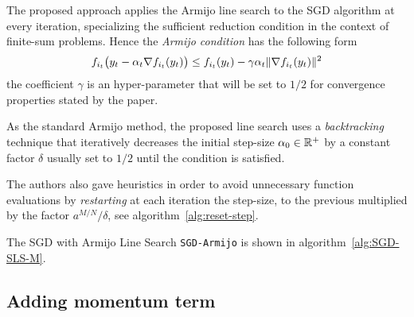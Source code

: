 The proposed approach applies the Armijo line search to the SGD algorithm at every iteration, specializing the sufficient reduction condition in the context of finite-sum problems. Hence the \emph{Armijo condition} has the following form
\begin{equation}\label{eq:mini-armijo}
f_{i_t}\bigl(y_t-\alpha_t\nabla f_{i_t}(y_t)\bigr)\leq f_{i_t}(y_t)-\gamma\alpha_t\lVert\nabla f_{i_t}(y_t)\rVert^2
\end{equation}
the coefficient $\gamma$ is an hyper-parameter that will be set to $1/2$ for convergence properties stated by the paper.


As the standard Armijo method, the proposed line search uses a \emph{backtracking} technique that iteratively decreases the initial step-size $\alpha_0\in\mathbb{R}^+$ by a constant factor $\delta$ usually set to $1/2$ until the condition is satisfied.

The authors also gave heuristics in order to avoid unnecessary function evaluations by \emph{restarting} at each iteration the step-size, to the previous multiplied by the factor $a^{M/N}/\delta$, see algorithm~\vref{alg:reset-step}.

The SGD with Armijo Line Search \texttt{SGD-Armijo} is shown in algorithm~\vref{alg:SGD-SLS-M}.

\subsection{Adding momentum term}\label{subsc:sgdm}

